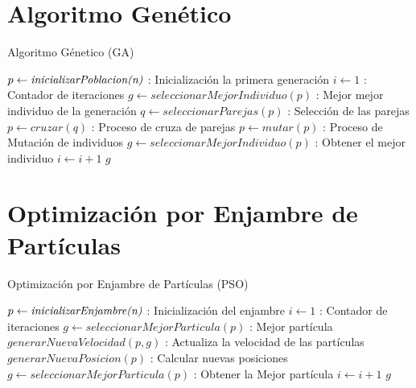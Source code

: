 \documentclass[10pt,letterpaper,twoside,openright]{article}
\begin{document}
	\section{Algoritmo Genético}
	
		\begin{algorithm}[H]
			\caption{Algoritmo Génetico (GA)}
				$ p \leftarrow \emph{inicializarPoblacion(n)}$ : Inicialización la primera generación\;
				$ i \leftarrow 1 $ : Contador de iteraciones\;
				$ g \leftarrow seleccionarMejorIndividuo(p) $ : Mejor mejor individuo de la generación\;
				{
					$q \leftarrow seleccionarParejas(p) $ : Selección de las parejas\;
					$ p \leftarrow cruzar(q) $ : Proceso de cruza de parejas\;
					$ p \leftarrow mutar(p) $ : Proceso de Mutación de individuos\;
					$ g \leftarrow seleccionarMejorIndividuo(p) $ : Obtener el mejor individuo\;
					$ i \leftarrow  i + 1 $\;
				}
		 		\Return $ g $
		 \end{algorithm}
	
	\section{Optimización por Enjambre de Partículas}
	
		\begin{algorithm}[H]
			\caption{Optimización por Enjambre de Partículas (PSO)}
				$ p \leftarrow \emph{inicializarEnjambre(n)}$ : Inicialización del enjambre\;
				$ i \leftarrow 1 $ : Contador de iteraciones\;
				$ g \leftarrow seleccionarMejorParticula(p) $ : Mejor partícula\;
				{
					$ generarNuevaVelocidad(p,g) $ : Actualiza la velocidad de las partículas\;
					$ generarNuevaPosicion(p) $ : Calcular nuevas posiciones\;
					$ g \leftarrow seleccionarMejorParticula(p) $ : Obtener la Mejor partícula\;
					$ i \leftarrow  i + 1 $\;
				}
		 		\Return $ g $
		 \end{algorithm}
\end{document}
